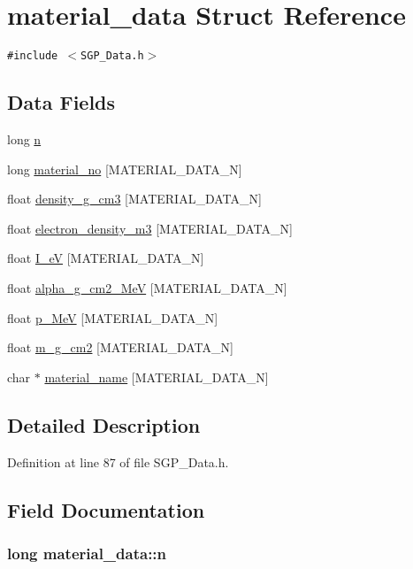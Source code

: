 \hypertarget{structmaterial__data}{
\section{material\_\-data Struct Reference}
\label{de/d38/structmaterial__data}
}
{\tt \#include $<$SGP\_\-Data.h$>$}

\subsection*{Data Fields}
\begin{CompactItemize}
\item 
long \hyperlink{structmaterial__data_82fda242d68cb4e3f1cc50c0e13594c6}{n}
\item 
long \hyperlink{structmaterial__data_f70a3cdf7d0d845934a08cb14c8c6c38}{material\_\-no} \mbox{[}MATERIAL\_\-DATA\_\-N\mbox{]}
\item 
float \hyperlink{structmaterial__data_4f64945234a21771d3bdfe43ca3dd059}{density\_\-g\_\-cm3} \mbox{[}MATERIAL\_\-DATA\_\-N\mbox{]}
\item 
float \hyperlink{structmaterial__data_7757738688ad862124a2fbd07a8558f1}{electron\_\-density\_\-m3} \mbox{[}MATERIAL\_\-DATA\_\-N\mbox{]}
\item 
float \hyperlink{structmaterial__data_fe47730c4df2973d45d16e49662f6a45}{I\_\-eV} \mbox{[}MATERIAL\_\-DATA\_\-N\mbox{]}
\item 
float \hyperlink{structmaterial__data_ccf93507c8fdafb2e4a1ab1edfe2aa7e}{alpha\_\-g\_\-cm2\_\-MeV} \mbox{[}MATERIAL\_\-DATA\_\-N\mbox{]}
\item 
float \hyperlink{structmaterial__data_929cba0ae67c07bb2080dacb8ebafa08}{p\_\-MeV} \mbox{[}MATERIAL\_\-DATA\_\-N\mbox{]}
\item 
float \hyperlink{structmaterial__data_2be24c819e1bb262cf0079c6d7f296c2}{m\_\-g\_\-cm2} \mbox{[}MATERIAL\_\-DATA\_\-N\mbox{]}
\item 
char $\ast$ \hyperlink{structmaterial__data_f0d28c3429e16c05785876ab2f955eda}{material\_\-name} \mbox{[}MATERIAL\_\-DATA\_\-N\mbox{]}
\end{CompactItemize}


\subsection{Detailed Description}


Definition at line 87 of file SGP\_\-Data.h.

\subsection{Field Documentation}
\hypertarget{structmaterial__data_82fda242d68cb4e3f1cc50c0e13594c6}{
\subsubsection[n]{\setlength{\rightskip}{0pt plus 5cm}long {\bf material\_\-data::n}}}
\label{de/d38/structmaterial__data_82fda242d68cb4e3f1cc50c0e13594c6}




